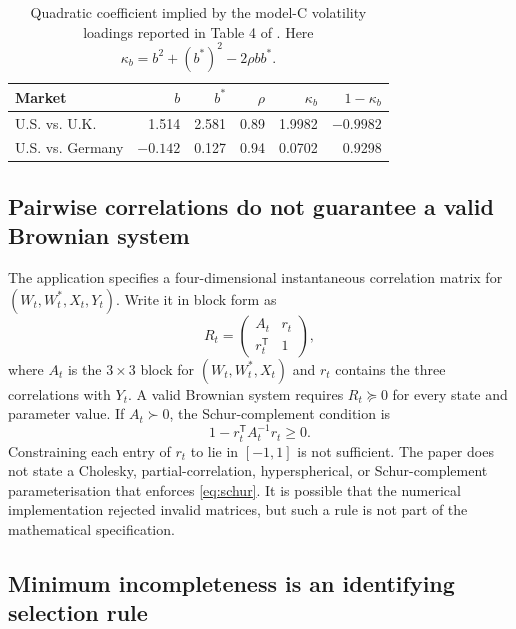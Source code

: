 \documentclass[11pt]{article}
\theoremstyle{definition}
\begin{document}
\begin{table}[t]
\centering
\caption{Quadratic coefficient implied by the model-C volatility loadings reported in Table 4 of \citet{BrandtSantaClara2002}. Here $\kappa_b=b^2+(b^*)^2-2\rho bb^*$.}
\label{tab:implicit_coefficients}
\begin{tabular}{lrrrrr}
\toprule
Market & $b$ & $b^*$ & $\rho$ & $\kappa_b$ & $1-\kappa_b$ \\
\midrule
U.S. vs. U.K. & 1.514 & 2.581 & 0.89 & 1.9982 & $-0.9982$ \\
U.S. vs. Germany & $-0.142$ & 0.127 & 0.94 & 0.0702 & 0.9298 \\
\bottomrule
\end{tabular}
\end{table}

\subsection{Pairwise correlations do not guarantee a valid Brownian system}

The application specifies a four-dimensional instantaneous correlation matrix for $(W_t,W_t^*,X_t,Y_t)$. Write it in block form as
\begin{equation}\label{eq:corr_block}
R_t=
\begin{pmatrix}
A_t&r_t\\
r_t^{\mathsf T}&1
\end{pmatrix},
\end{equation}
where $A_t$ is the $3\times3$ block for $(W_t,W_t^*,X_t)$ and $r_t$ contains the three correlations with $Y_t$. A valid Brownian system requires $R_t\succeq0$ for every state and parameter value. If $A_t\succ0$, the Schur-complement condition is
\begin{equation}\label{eq:schur}
1-r_t^{\mathsf T}A_t^{-1}r_t\ge0.
\end{equation}
Constraining each entry of $r_t$ to lie in $[-1,1]$ is not sufficient. The paper does not state a Cholesky, partial-correlation, hyperspherical, or Schur-complement parameterisation that enforces \eqref{eq:schur}. It is possible that the numerical implementation rejected invalid matrices, but such a rule is not part of the mathematical specification.

\subsection{Minimum incompleteness is an identifying selection rule}
\end{document}
